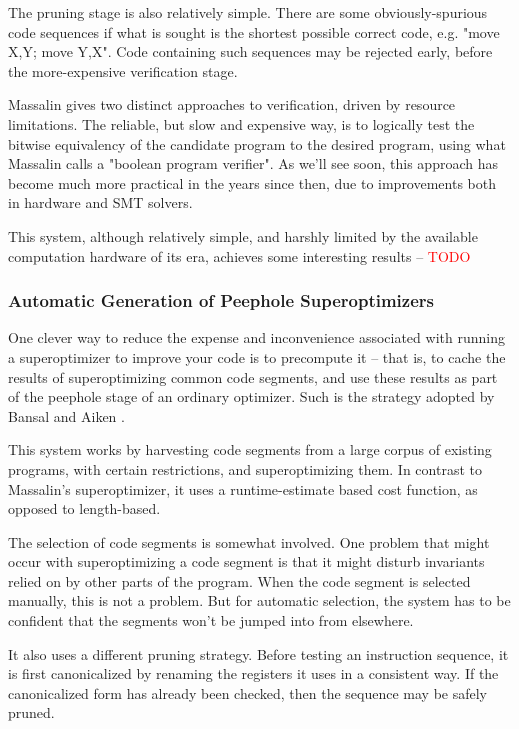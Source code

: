 \documentclass[12pt,twoside]{reedthesis}
\newcommand{\red}[1]{\textcolor{red}{#1}}
\begin{document}
The pruning stage is also relatively simple. There are some obviously-spurious code sequences if what is sought is the shortest possible correct code, e.g. "move X,Y; move Y,X".
Code containing such sequences may be rejected early, before the more-expensive verification stage.

Massalin gives two distinct approaches to verification, driven by resource limitations.
The reliable, but slow and expensive way, is to logically test the bitwise equivalency of the candidate program to the desired program, using what Massalin calls a "boolean program verifier".
As we'll see soon, this approach has become much more practical in the years since then, due to improvements both in hardware and SMT solvers. 

This system, although relatively simple, and harshly limited by the available computation hardware of its era, achieves some interesting results -- \red{TODO} %

\subsubsection{Automatic Generation of Peephole Superoptimizers}

One clever way to reduce the expense and inconvenience associated with running a superoptimizer to improve your code is to precompute it
-- that is, to cache the results of superoptimizing common code segments, and use these results as part of the peephole stage of an ordinary optimizer.
Such is the strategy adopted by Bansal and Aiken \cite{bansal2006peephole}.

This system works by harvesting code segments from a large corpus of existing programs, with certain restrictions, and superoptimizing them. 
In contrast to Massalin's superoptimizer, it uses a runtime-estimate based cost function, as opposed to length-based.

The selection of code segments is somewhat involved.
One problem that might occur with superoptimizing a code segment is that it might disturb invariants relied on by other parts of the program.
When the code segment is selected manually, this is not a problem.
But for automatic selection, the system has to be confident that the segments won't be jumped into from elsewhere. 

It also uses a different pruning strategy.
Before testing an instruction sequence, it is first canonicalized by renaming the registers it uses in a consistent way.
If the canonicalized form has already been checked, then the sequence may be safely pruned.
\end{document}
